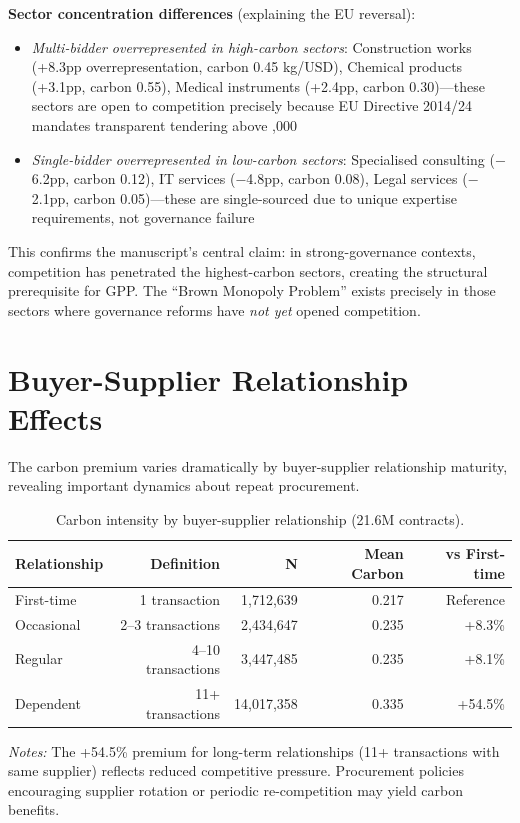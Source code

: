 \documentclass[11pt]{article}
\newcommand{\tabnoteblock}[1]{%
    \par\vspace{0.45em}%
    \begin{minipage}{0.98\linewidth}
    \footnotesize\raggedright #1
    \end{minipage}\par
}
\newcommand{\tabnotes}[1]{\tabnoteblock{\textit{Notes:} #1}}
\begin{document}
\textbf{Sector concentration differences} (explaining the EU reversal):
\begin{itemize}
    \item \textit{Multi-bidder overrepresented in high-carbon sectors}: Construction works (+8.3pp overrepresentation, carbon 0.45 kg/USD), Chemical products (+3.1pp, carbon 0.55), Medical instruments (+2.4pp, carbon 0.30)---these sectors are open to competition precisely because EU Directive 2014/24 mandates transparent tendering above ,000
    \item \textit{Single-bidder overrepresented in low-carbon sectors}: Specialised consulting ($-$6.2pp, carbon 0.12), IT services ($-$4.8pp, carbon 0.08), Legal services ($-$2.1pp, carbon 0.05)---these are single-sourced due to unique expertise requirements, not governance failure
\end{itemize}

This confirms the manuscript's central claim: in strong-governance contexts, competition has penetrated the highest-carbon sectors, creating the structural prerequisite for GPP. The ``Brown Monopoly Problem'' exists precisely in those sectors where governance reforms have \textit{not yet} opened competition.

\section{Buyer-Supplier Relationship Effects}

The carbon premium varies dramatically by buyer-supplier relationship maturity, revealing important dynamics about repeat procurement.

\begin{table}[H]
\centering
\caption{Carbon intensity by buyer-supplier relationship (21.6M contracts).}
\label{tab:relationship}
\begin{tabular}{lrrrr}
\toprule
\textbf{Relationship} & \textbf{Definition} & \textbf{N} & \textbf{Mean Carbon} & \textbf{vs First-time} \\
\midrule
First-time & 1 transaction & 1,712,639 & 0.217 & Reference \\
Occasional & 2--3 transactions & 2,434,647 & 0.235 & +8.3\% \\
Regular & 4--10 transactions & 3,447,485 & 0.235 & +8.1\% \\
Dependent & 11+ transactions & 14,017,358 & 0.335 & +54.5\% \\
\bottomrule
\end{tabular}

\tabnotes{The +54.5\% premium for long-term relationships (11+ transactions with same supplier) reflects reduced competitive pressure. Procurement policies encouraging supplier rotation or periodic re-competition may yield carbon benefits.
}
\end{table}
\end{document}

